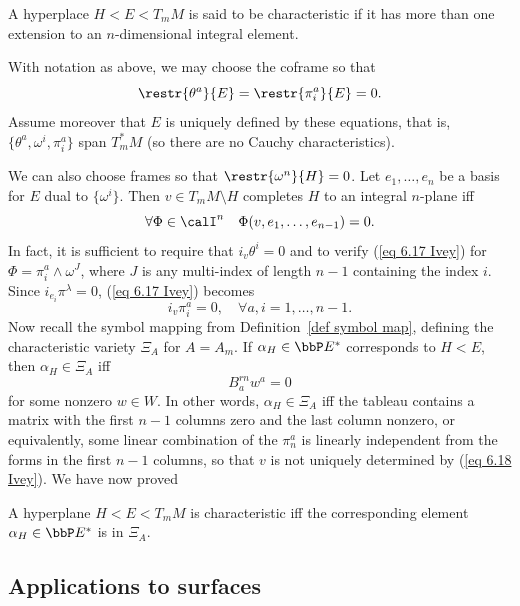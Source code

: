 \begin{defn}
    A hyperplace $H<E<T_mM$ is said to be characteristic if it has more than one extension to an $n$-dimensional integral element.
\end{defn}

With notation as above, we may choose the coframe so that 
\[\restr{\theta^a}{E}=\restr{\pi^a_i}{E}=0.\]
Assume moreover that $E$ is uniquely defined by these equations, that is, $\{\theta^a,\omega^i,\pi^a_i\}$ span $T_m^\ast M$ (so there are no Cauchy characteristics).

We can also choose frames so that $\restr{\omega^n}{H}=0$. Let $e_1,\ldots,e_n$ be a basis for $E$ dual to $\{\omega^i\}$. Then $v\in T_mM\setminus H$ completes $H$ to an integral $n$-plane iff 
\[\forall\Phi \in\calI^n\quad \Phi (v,e_1,\ldots,e_{n-1})=0.\label{eq 6.17 Ivey}\]
In fact, it is sufficient to require that $i_v \theta^i=0$ and to verify (\ref{eq 6.17 Ivey}) for $\Phi=\pi^a_i\wedge \omega^J$, where $J$ is any multi-index of length $n-1$ containing the index $i$. Since $i_{e_i}\pi^\lambda=0$, (\ref{eq 6.17 Ivey}) becomes 
\[i_v\pi^a_i=0,\quad  \forall a, i=1,\ldots,n-1.\label{eq 6.18 Ivey}\]
Now recall the symbol mapping from Definition~\ref{def symbol map}, defining the characteristic variety $\Xi_A$ for $A=A_m$. If $\alpha_H\in \bbP E^\ast$ corresponds to $H<E$, then $\alpha_H\in \Xi_A$ iff 
\[B^{rn}_a w^a=0\]
for some nonzero $w\in W$. In other words, $\alpha_H\in\Xi_A$ iff the tableau contains a matrix with the first $n-1$ columns zero and the last column nonzero, or equivalently, some linear combination of the $\pi^a_n$ is linearly independent from the forms in the first $n-1$ columns, so that $v$ is not uniquely determined by (\ref{eq 6.18 Ivey}). We have now proved 
\begin{thm}
    A hyperplane $H<E<T_mM$ is characteristic iff the corresponding element $\alpha_H\in\bbP E^\ast$ is in $\Xi_A$.
\end{thm}









\subsection{Applications to surfaces}


